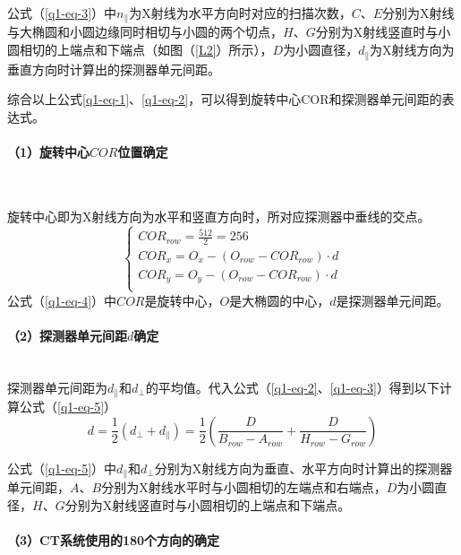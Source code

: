 \documentclass[withoutpreface,bwprint]{cumcmthesis} %
\begin{document}
公式（\ref{q1-eq-3}）中$n_{\parallel}$为X射线为水平方向时对应的扫描次数，$C$、$E$分别为X射线与大椭圆和小圆边缘同时相切与小圆的两个切点，$H$、$G$分别为X射线竖直时与小圆相切的上端点和下端点（如图（\ref{L2}）所示），$D$为小圆直径，$d_{\parallel}$为X射线方向为垂直方向时计算出的探测器单元间距。

综合以上公式\ref{q1-eq-1}、\ref{q1-eq-2}，可以得到旋转中心COR和探测器单元间距的表达式。


\paragraph*{（1）旋转中心$COR$位置确定}~\\

\par 旋转中心即为X射线方向为水平和竖直方向时，所对应探测器中垂线的交点。
\begin{equation}
	\label{q1-eq-4}
	\left\{
	\begin{split}
		COR_{row} = \frac{512}{2} = 256 \\
		COR_{x} = O_{x} - (O_{row} - COR_{row}) \cdot d \\
		COR_{y} = O_{y} - (O_{row} - COR_{row}) \cdot d \\
	\end{split}
	\right.
\end{equation}
公式（\ref{q1-eq-4}）中$COR$是旋转中心，$O$是大椭圆的中心，$d$是探测器单元间距。

\paragraph*{（2）探测器单元间距$d$确定}~\\

探测器单元间距为$d_{\parallel}$和$d_{\perp}$的平均值。代入公式（\ref{q1-eq-2}、\ref{q1-eq-3}）得到以下计算公式（\ref{q1-eq-5}）
\begin{equation}
	\label{q1-eq-5}
	d = \frac{1}{2}(d_{\perp} + d_{\parallel}) = \frac{1}{2} \left( \frac{D}{B_{row} - A_{row}} + \frac{D}{H_{row} - G_{row}} \right)
\end{equation}

公式（\ref{q1-eq-5}）中$d_{\parallel}$和$d_{\perp}$分别为X射线方向为垂直、水平方向时计算出的探测器单元间距，$A$、$B$分别为X射线水平时与小圆相切的左端点和右端点，$D$为小圆直径，$H$、$G$分别为X射线竖直时与小圆相切的上端点和下端点。

\paragraph*{（3）CT系统使用的180个方向的确定}~\\
\end{document}
